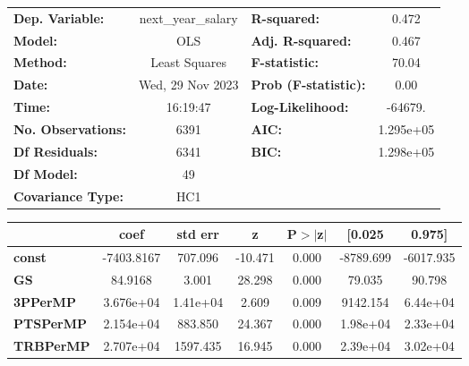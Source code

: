 \begin{center}
\begin{tabular}{lclc}
\toprule
\textbf{Dep. Variable:}       & next\_year\_salary & \textbf{  R-squared:         } &     0.472   \\
\textbf{Model:}               &        OLS         & \textbf{  Adj. R-squared:    } &     0.467   \\
\textbf{Method:}              &   Least Squares    & \textbf{  F-statistic:       } &     70.04   \\
\textbf{Date:}                &  Wed, 29 Nov 2023  & \textbf{  Prob (F-statistic):} &     0.00    \\
\textbf{Time:}                &      16:19:47      & \textbf{  Log-Likelihood:    } &   -64679.   \\
\textbf{No. Observations:}    &         6391       & \textbf{  AIC:               } & 1.295e+05   \\
\textbf{Df Residuals:}        &         6341       & \textbf{  BIC:               } & 1.298e+05   \\
\textbf{Df Model:}            &           49       & \textbf{                     } &             \\
\textbf{Covariance Type:}     &        HC1         & \textbf{                     } &             \\
\bottomrule
\end{tabular}
\begin{tabular}{lcccccc}
                              & \textbf{coef} & \textbf{std err} & \textbf{z} & \textbf{P$> |$z$|$} & \textbf{[0.025} & \textbf{0.975]}  \\
\midrule
\textbf{const}                &   -7403.8167  &      707.096     &   -10.471  &         0.000        &    -8789.699    &    -6017.935     \\
\textbf{GS}                   &      84.9168  &        3.001     &    28.298  &         0.000        &       79.035    &       90.798     \\
\textbf{3PPerMP}              &    3.676e+04  &     1.41e+04     &     2.609  &         0.009        &     9142.154    &     6.44e+04     \\
\textbf{PTSPerMP}             &    2.154e+04  &      883.850     &    24.367  &         0.000        &     1.98e+04    &     2.33e+04     \\
\textbf{TRBPerMP}             &    2.707e+04  &     1597.435     &    16.945  &         0.000        &     2.39e+04    &     3.02e+04     \\

\end{tabular}
\end{center}
